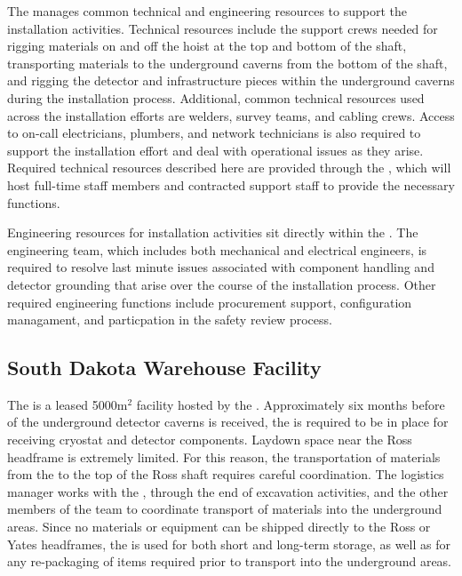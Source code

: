 The  manages common technical and engineering resources 
to support the  installation activities.  Technical
resources include the support crews needed for rigging materials on and off the hoist 
at the top and bottom of the shaft, transporting materials to the
underground caverns from the bottom of the shaft, and rigging the 
detector and infrastructure pieces within the underground caverns 
during the installation process.  Additional, common technical 
resources used across the installation efforts are welders, 
survey teams, and cabling crews.  Access to on-call electricians, 
plumbers, and network technicians is also required to support 
the installation effort and deal with operational issues as they 
arise.  Required technical resources described here are provided 
through the , which will host full-time staff members 
and contracted support staff to provide the necessary functions.     

Engineering resources for  installation activities 
sit directly within the .  The engineering team, which 
includes both mechanical and electrical engineers, is required to 
resolve last minute issues associated with component handling and 
detector grounding that arise over the course of the installation 
process.  Other required engineering functions include procurement
support, configuration managament, and particpation in the safety 
review process.

\subsection{South Dakota Warehouse Facility}

The  is a leased 5000m$^2$ facility hosted by the
.  Approximately six months before 
of the underground detector caverns is received, the  
is required to be in place for receiving cryostat and detector 
components.  Laydown space near the Ross headframe is extremely 
limited.  For this reason, the transportation of materials from 
the  to the top of the Ross shaft requires careful 
coordination. The  logistics manager works with 
the , through the end of excavation activities, and 
the other members of the  team to coordinate transport 
of materials into the underground areas.  Since no materials or 
equipment can be shipped directly to the Ross or Yates headframes, 
the  is used for both short and long-term storage, as 
well as for any re-packaging of items required prior to transport 
into the underground areas. 

